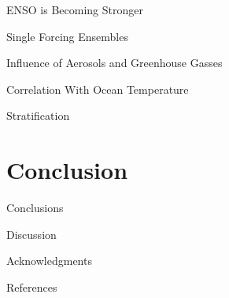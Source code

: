 \documentclass{beamer}
\begin{document}
\begin{frame}{ENSO is Becoming Stronger}

\end{frame}

\begin{frame}{Single Forcing Ensembles}

\end{frame}

\begin{frame}{Influence of Aerosols and Greenhouse Gasses}

\end{frame}

\begin{frame}{Correlation With Ocean Temperature}

\end{frame}

\begin{frame}{Stratification}

\end{frame}

\section{Conclusion}

\begin{frame}{Conclusions}

\end{frame}

\begin{frame}{Discussion}

\end{frame}

\begin{frame}{Acknowledgments}

\end{frame}

\begin{frame}{References}
  
  \fontsize{7pt}{7.2}\selectfont
  
\end{frame}

\maketitle
\end{document}
